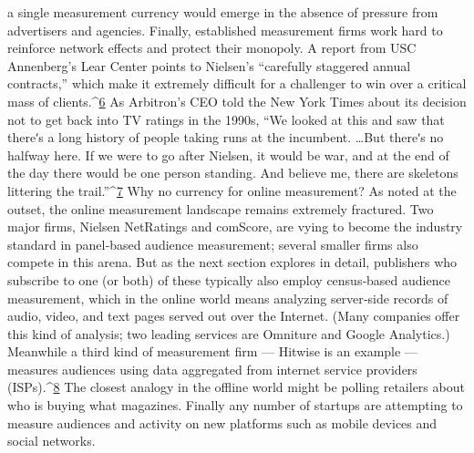 a single measurement currency would emerge in the absence of pressure
from advertisers and agencies.
Finally, established measurement firms work hard to reinforce network
effects and protect their monopoly. A report from USC Annenberg’s Lear
Center points to Nielsen’s ``carefully staggered annual contracts,'' which
make it extremely difficult for a challenger to win over a critical mass of
clients.^{\href{#endnotes}{6}} As Arbitron’s CEO told the New York Times about its decision not
to get back into TV ratings in the 1990s, ``We looked at this and saw that
thereʹs a long history of people taking runs at the incumbent. \ldots  But
thereʹs no halfway here. If we were to go after Nielsen, it would be war,
and at the end of the day there would be one person standing. And
believe me, there are skeletons littering the trail.''^{\href{#endnotes}{7}}
Why no currency for online measurement?
As noted at the outset, the online measurement landscape remains
extremely fractured. Two major firms, Nielsen NetRatings and comScore,
are vying to become the industry standard in panel‐based audience
measurement; several smaller firms also compete in this arena. But as the
next section explores in detail, publishers who subscribe to one (or both)
of these typically also employ census‐based audience measurement,
which in the online world means analyzing server‐side records of audio,
video, and text pages served out over the Internet. (Many companies offer
this kind of analysis; two leading services are Omniture and Google
Analytics.) Meanwhile a third kind of measurement firm — Hitwise is an
example — measures audiences using data aggregated from internet
service providers (ISPs).^{\href{#endnotes}{8}} The closest analogy in the offline world might be
polling retailers about who is buying what magazines. Finally any number
of startups are attempting to measure audiences and activity on new
platforms such as mobile devices and social networks.

